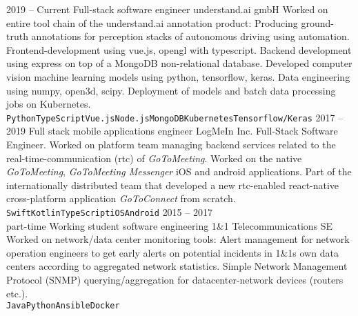 \documentclass[8pt]{developercv} %
\newcommand{\linebreaksmall}{\vspace{2mm}}
\begin{document}
\begin{entrylist}
	\entry
		{2019 -- Current}
		{Full-stack software engineer}
		{understand.ai gmbH}
		{Worked on entire tool chain of the understand.ai annotation product: Producing ground-truth annotations for perception stacks of autonomous driving using automation. Frontend-development using vue.js, opengl with typescript. Backend development using express on top of a MongoDB non-relational database. Developed computer vision machine learning models using python, tensorflow, keras. Data engineering using numpy, open3d, scipy. Deployment of models and batch data processing jobs on Kubernetes.
		\linebreaksmall \\ \texttt{Python}\slashsep\texttt{TypeScript}\slashsep\texttt{Vue.js}\slashsep\texttt{Node.js}\slashsep\texttt{MongoDB}\slashsep\texttt{Kubernetes}\slashsep\texttt{Tensorflow/Keras}} \linebreaksmall
	\entry
		{2017 -- 2019}
		{Full stack mobile applications engineer}
		{LogMeIn Inc.}
		{Full-Stack Software Engineer. Worked on platform team managing backend services related to the real-time-communication (rtc) of \textit{GoToMeeting}. Worked on the native \textit{GoToMeeting}, \textit{GoToMeeting Messenger} iOS and android applications. Part of the internationally distributed team that developed a new rtc-enabled react-native cross-platform application \textit{GoToConnect} from scratch.
		\linebreaksmall \\ \texttt{Swift}\slashsep\texttt{Kotlin}\slashsep\texttt{TypeScript}\slashsep\texttt{iOS}\slashsep\texttt{Android}} \linebreaksmall
	\entry
		{2015 -- 2017\\\footnotesize{part-time}}
		{Working student software engineering}
		{1\&1 Telecommunications SE}
		{Worked on network/data center monitoring tools: Alert management for network operation engineers to get early alerts on potential incidents in 1\&1s own data centers according to aggregated network statistics. Simple Network Management Protocol (SNMP) querying/aggregation for datacenter-network devices (routers etc.).
		\linebreaksmall \\ \texttt{Java}\slashsep\texttt{Python}\slashsep\texttt{Ansible}\slashsep\texttt{Docker}}
\end{entrylist}


\end{document}

